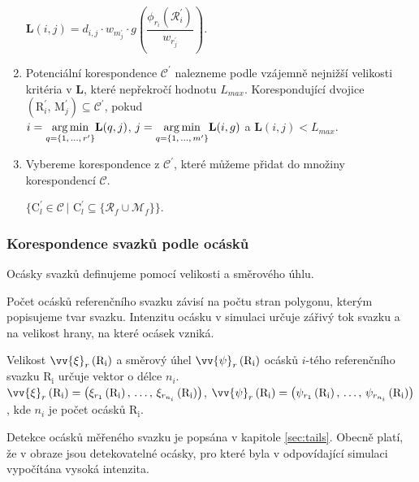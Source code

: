 \begin{enumerate}
$\mathbf{L}(i,j) = d_{i,j}\cdot w_{m^\prime_{j}} \cdot g \left(\dfrac{\phi_{r_i}(\mathcal{R}^\prime_i)}{w_{r^\prime_{j}}} \right)$. 


\item Potenciální korespondence $\mathcal{C}^\prime$ nalezneme podle vzájemně nejnižší velikosti  kritéria v $\mathbf{L}$, které nepřekročí hodnotu $L_{max}$. Korespondující dvojice $\left(\mathrm{R}^\prime_i,\,\mathrm{M}^\prime_j \right) \subseteq \mathcal{C}^\prime$, pokud\\ $i = \underset{{q = \lbrace1,\,\dots,\,r^\prime\rbrace}}{\operatorname*{arg\,min}}\mathbf{L}(q,j)$, $j = \underset{{q = \lbrace1,\,\dots,\,m^\prime\rbrace}}{\operatorname*{arg\,min}}\mathbf{L}(i,g)$ a  $\mathbf{L}(i,j) < L_{max}$. 

\item Vybereme korespondence z $\mathcal{C}^\prime$, které můžeme přidat do množiny korespondencí $\mathcal{C}$. 

 $\lbrace \mathrm{C}^\prime_l \in \mathcal{C}\,|\,\, \mathrm{C}^\prime_l \subseteq \lbrace\mathcal{R}_f \cup \mathcal{M}_f\rbrace \rbrace$.

 
\end{enumerate}

\newpage
\subsubsection{Korespondence svazků podle ocásků}
\label{sec: korespondence_ocasky}
		
	Ocásky svazků definujeme pomocí velikosti a směrového úhlu.
	
	Počet ocásků referenčního svazku závisí na počtu stran polygonu, kterým popisujeme tvar svazku. Intenzitu ocásku v simulaci určuje zářivý tok svazku a na velikost hrany, na které ocásek vzniká. 
	
	Velikost $\vv{\xi}_{r}\left(\mathrm{R_i}\right)$ a směrový úhel $\vv{\psi}_{r}\left(\mathrm{R_i}\right)$ ocásků  $i$-tého referenčního svazku $\mathrm{R_i}$ určuje vektor o délce $n_i$.\\
	 $\vv{\xi}_{r}\left(\mathrm{R_i}\right) = \left(\xi_{r_1}\left(\mathrm{R_i}\right),\,\dots,\,\xi_{r_{n_i}}\left(\mathrm{R_i}\right)\right)$, $\vv{\psi}_{r}\left(\mathrm{R_i}\right) = \left(\psi_{r_1}\left(\mathrm{R_i}\right),\,\dots,\,\psi_{r_{n_i}}\left(\mathrm{R_i}\right)\right)$, kde $n_i$ je počet ocásků $\mathrm{R_i}$. 
	
	Detekce ocásků měřeného svazku je popsána v kapitole \ref{sec:tails}. Obecně platí, že v obraze jsou detekovatelné ocásky, pro které byla v odpovídající simulaci vypočítána vysoká intenzita. 
	
